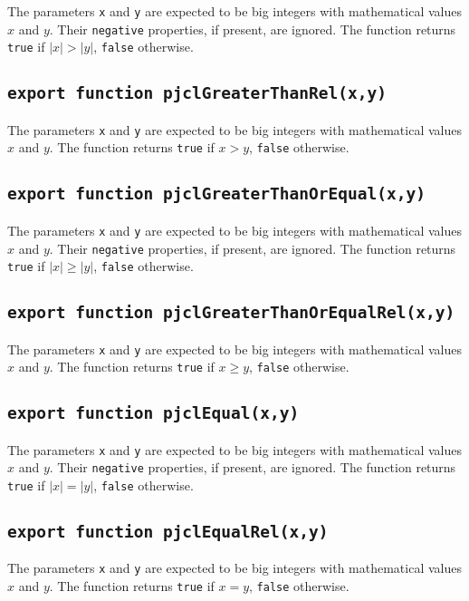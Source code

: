 \documentclass[12pt]{article}
\begin{document}
The parameters {\tt x} and {\tt y} are expected to be big integers
with mathematical values $x$ and $y$.  Their {\tt negative}
properties, if present, are ignored.  The function returns {\tt true}
if $|x| > |y|$, {\tt false} otherwise.

\subsection{\tt export function pjclGreaterThanRel(x,y)}

The parameters {\tt x} and {\tt y} are expected to be big integers
with mathematical values $x$ and $y$.  The function returns {\tt true}
if $x > y$, {\tt false} otherwise.

\subsection{\tt export function pjclGreaterThanOrEqual(x,y)}

The parameters {\tt x} and {\tt y} are expected to be big integers
with mathematical values $x$ and $y$.  Their {\tt negative}
properties, if present, are ignored.  The function returns {\tt true}
if $|x| \geq |y|$, {\tt false} otherwise.

\subsection{\tt export function pjclGreaterThanOrEqualRel(x,y)}

The parameters {\tt x} and {\tt y} are expected to be big integers
with mathematical values $x$ and $y$.  The function returns {\tt true}
if $x \geq y$, {\tt false} otherwise.

\subsection{\tt export function pjclEqual(x,y)}

The parameters {\tt x} and {\tt y} are expected to be big integers
with mathematical values $x$ and $y$.  Their {\tt negative}
properties, if present, are ignored.  The function returns {\tt true}
if $|x| = |y|$, {\tt false} otherwise.

\subsection{\tt export function pjclEqualRel(x,y)}

The parameters {\tt x} and {\tt y} are expected to be big integers
with mathematical values $x$ and $y$.  The function returns {\tt true}
if $x = y$, {\tt false} otherwise.
\end{document}

